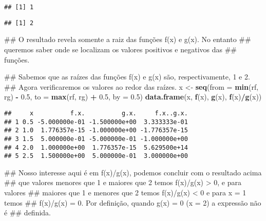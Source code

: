 \documentclass[]{book}
\newenvironment{Shaded}{\begin{snugshade}}{\end{snugshade}}
\newcommand{\KeywordTok}[1]{\textcolor[rgb]{0.13,0.29,0.53}{\textbf{#1}}}
\newcommand{\DataTypeTok}[1]{\textcolor[rgb]{0.13,0.29,0.53}{#1}}
\newcommand{\DecValTok}[1]{\textcolor[rgb]{0.00,0.00,0.81}{#1}}
\newcommand{\FloatTok}[1]{\textcolor[rgb]{0.00,0.00,0.81}{#1}}
\newcommand{\StringTok}[1]{\textcolor[rgb]{0.31,0.60,0.02}{#1}}
\newcommand{\OperatorTok}[1]{\textcolor[rgb]{0.81,0.36,0.00}{\textbf{#1}}}
\newcommand{\NormalTok}[1]{#1}
\begin{document}
\begin{enumerate}
\begin{verbatim}
## [1] 1
\end{verbatim}

\begin{Shaded}
\end{Shaded}

\begin{verbatim}
## [1] 2
\end{verbatim}

\begin{Shaded}
\begin{Highlighting}[]
\NormalTok{##  O resultado revela somente a raiz das funções f(x) e g(x). No entanto}
\NormalTok{## queremos saber onde se localizam os valores positivos e negativos das}
\NormalTok{## funções.}

\NormalTok{##  Sabemos que as raízes das funções f(x) e g(x) são, respectivamente, 1 e 2.}
\NormalTok{## Agora verificaremos os valores ao redor das raízes.}
\NormalTok{x <-}\StringTok{ }\KeywordTok{seq}\NormalTok{(}\DataTypeTok{from =} \KeywordTok{min}\NormalTok{(rf, rg) }\OperatorTok{-}\StringTok{ }\FloatTok{0.5}\NormalTok{, }\DataTypeTok{to =} \KeywordTok{max}\NormalTok{(rf, rg) }\OperatorTok{+}\StringTok{ }\FloatTok{0.5}\NormalTok{, }\DataTypeTok{by =} \FloatTok{0.5}\NormalTok{)}
\KeywordTok{data.frame}\NormalTok{(x, }\KeywordTok{f}\NormalTok{(x), }\KeywordTok{g}\NormalTok{(x), }\KeywordTok{f}\NormalTok{(x)}\OperatorTok{/}\KeywordTok{g}\NormalTok{(x))}
\end{Highlighting}
\end{Shaded}

\begin{verbatim}
##     x          f.x.          g.x.     f.x..g.x.
## 1 0.5 -5.000000e-01 -1.500000e+00  3.333333e-01
## 2 1.0  1.776357e-15 -1.000000e+00 -1.776357e-15
## 3 1.5  5.000000e-01 -5.000000e-01 -1.000000e+00
## 4 2.0  1.000000e+00  1.776357e-15  5.629500e+14
## 5 2.5  1.500000e+00  5.000000e-01  3.000000e+00
\end{verbatim}

\begin{Shaded}
\begin{Highlighting}[]
\NormalTok{##  Nosso interesse aqui é em f(x)/g(x), podemos concluir com o resultado acima}
\NormalTok{## que valores menores que 1 e maiores que 2 temos f(x)/g(x) > 0, e para valores}
\NormalTok{## maiores que 1 e menores que 2 temos f(x)/g(x) < 0 e para x = 1 temos}
\NormalTok{## f(x)/g(x) = 0. Por definição, quando g(x) = 0 (x = 2) a expressão não é}
\NormalTok{## definida.}


\end{Highlighting}
\end{Shaded}
\end{enumerate}
\end{document}
